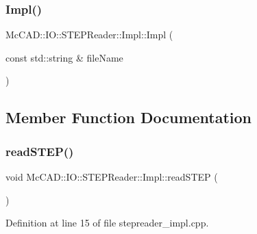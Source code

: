 \subsubsection{\texorpdfstring{Impl()}{Impl()}\hspace{0.1cm}{\footnotesize\ttfamily [2/2]}}
{\footnotesize\ttfamily Mc\+C\+A\+D\+::\+I\+O\+::\+S\+T\+E\+P\+Reader\+::\+Impl\+::\+Impl (\begin{DoxyParamCaption}\item[{const std\+::string \&}]{file\+Name }\end{DoxyParamCaption})}



\subsection{Member Function Documentation}
\mbox{\label{classMcCAD_1_1IO_1_1STEPReader_1_1Impl_adf3fe2fde0c4b949317c2e07b2fa57b9}} 
\subsubsection{\texorpdfstring{read\+S\+T\+E\+P()}{readSTEP()}\hspace{0.1cm}{\footnotesize\ttfamily [1/2]}}
{\footnotesize\ttfamily void Mc\+C\+A\+D\+::\+I\+O\+::\+S\+T\+E\+P\+Reader\+::\+Impl\+::read\+S\+T\+EP (\begin{DoxyParamCaption}{ }\end{DoxyParamCaption})}



Definition at line 15 of file stepreader\+\_\+impl.\+cpp.


